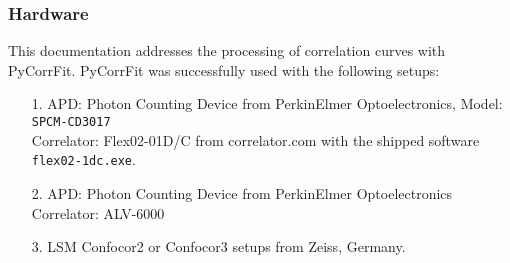 \subsubsection{Hardware}
This documentation addresses the processing of correlation curves with PyCorrFit. {PyCorrFit} was successfully used with the following setups:
\begin{itemize}
\item[1.]
     APD: Photon Counting Device from PerkinElmer Optoelectronics, Model: 	 \texttt{SPCM-CD3017}\\
     Correlator: Flex02-01D/C from correlator.com with the shipped software 	
	    		 \texttt{flex02-1dc.exe}.
\item[2.]
    APD: Photon Counting Device from PerkinElmer Optoelectronics\\
    Correlator: ALV-6000
\item[3.] LSM Confocor2 or Confocor3 setups from Zeiss, Germany.
\end{itemize}

